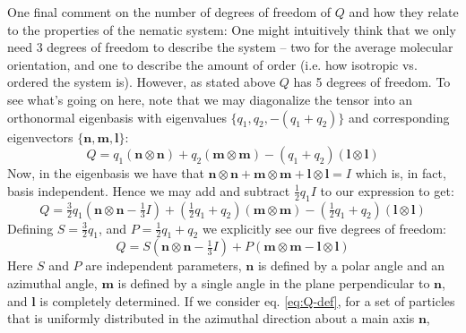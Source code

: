 \documentclass[reqno]{article}
\begin{document}
  One final comment on the number of degrees of freedom of $Q$ and how they
  relate to the properties of the nematic system:
  One might intuitively think that we only need 3 degrees of freedom to describe
  the system -- two for the average molecular orientation, and one to describe the
  amount of order (i.e. how isotropic vs. ordered the system is).
  However, as stated above $Q$ has 5 degrees of freedom.
  To see what's going on here, note that we may diagonalize the tensor into an
  orthonormal eigenbasis with eigenvalues $\{q_1, q_2, -(q_1 + q_2)\}$ and corresponding
  eigenvectors $\{\mathbf{n}, \mathbf{m}, \mathbf{l}\}$:
  \begin{equation}
    Q
    =
    q_1 (\mathbf{n} \otimes \mathbf{n})
    + q_2 (\mathbf{m} \otimes \mathbf{m})
    - (q_1 + q_2) (\mathbf{l} \otimes \mathbf{l})
  \end{equation}
  Now, in the eigenbasis we have that $\mathbf{n}\otimes\mathbf{n} +
  \mathbf{m}\otimes\mathbf{m} + \mathbf{l}\otimes\mathbf{l} = I$ which is, in
  fact, basis independent.
  Hence we may add and subtract $\frac12 q_1 I$ to our expression to get:
  \begin{equation}
    Q
    =
    \tfrac32 q_1 (\mathbf{n}\otimes\mathbf{n} - \tfrac13 I)
    + (\tfrac12 q_1 + q_2) (\mathbf{m} \otimes \mathbf{m})
    - (\tfrac12 q_1 + q_2) (\mathbf{l} \otimes \mathbf{l})
  \end{equation}
  Defining $S = \frac32 q_1$, and $P = \frac12 {q_1 + q_2}$ we explicitly see our
  five degrees of freedom:
  \begin{equation}
    Q
    = S (\mathbf{n} \otimes \mathbf{n} - \tfrac13 I)
    + P (\mathbf{m} \otimes \mathbf{m} - \mathbf{l} \otimes \mathbf{l})
  \end{equation}
  Here $S$ and $P$ are independent parameters, $\mathbf{n}$ is defined by a
  polar angle and an azimuthal angle, $\mathbf{m}$ is defined by a single angle
  in the plane perpendicular to $\mathbf{n}$, and $\mathbf{l}$ is completely
  determined.
  If we consider eq. \eqref{eq:Q-def}, for a set of particles that is uniformly
  distributed in the azimuthal direction about a main axis $\mathbf{n}$,
\end{document}
